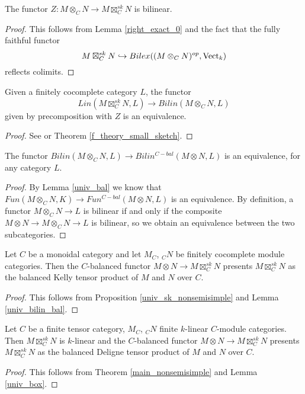 \begin{lemma}\label{right_exact}
The functor $Z:M\otimes_C N \to M\boxtimes_C^{sk}N$ is bilinear.
\end{lemma}
\begin{proof}
 This follows from Lemma \ref{right_exact_0} and the fact that the fully faithful functor $$M\boxtimes_C^{sk}N\hookrightarrow Bilex((M\otimes_C N)^{op},\operatorname{Vect}_k)$$ reflects colimits.\end{proof}



\begin{proposition}\label{univ_sk_nonsemisimple}
Given a finitely cocomplete category $L$, the functor $$Lin(M\boxtimes_C^{sk}N,L)\to Bilin(M\otimes_C N, L)$$ given by precomposition with $Z$ is an equivalence.\end{proposition}
\begin{proof} See \cite[Theorem 6.23]{kelly/basic-concepts-enriched} or Theorem \ref{f_theory_small_sketch}.\end{proof}

\begin{lemma}\label{univ_bilin_bal}
The functor $Bilin(M\otimes_C N,L)\to Bilin^{C-bal}(M\otimes N, L)$ is an equivalence, for any category $L$. \end{lemma}
\begin{proof}
By Lemma \ref{univ_bal} we know that $Fun(M\otimes_C N,K)\to Fun^{C-bal}(M\otimes N, L)$ is an equivalence. By definition, a functor $M\otimes_C N\to L$ is bilinear if and only if the composite $M\otimes N\to M\otimes_C N\to L$ is bilinear, so we obtain an equivalence between the two subcategories.\end{proof}

\begin{theorem}\label{main_nonsemisimple}
 Let $C$ be a monoidal category and let $M_C$, $_{C}N$ be finitely cocomplete module categories. Then the $C$-balanced functor $M\otimes N\to M\boxtimes_C^{sk}N$ presents $M\boxtimes_C^{sk}N$ as the balanced Kelly tensor product of $M$ and $N$ over $C$.\end{theorem}
 \begin{proof}

This follows from Proposition \ref{univ_sk_nonsemisimple} and Lemma \ref{univ_bilin_bal}.\end{proof}

\begin{corollary}

Let $C$ be a finite tensor category, $M_C$, $_{C}N$ finite $k$-linear $C$-module categories. Then $M\boxtimes_C^{sk}N$ is $k$-linear and the $C$-balanced functor $M\otimes N\to M\boxtimes_C^{sk}N$ presents $M\boxtimes_C^{sk}N$ as the balanced Deligne tensor product of $M$ and $N$ over $C$.\end{corollary}
\begin{proof}

This follows from Theorem \ref{main_nonsemisimple} and Lemma \ref{univ_box}.\end{proof}

